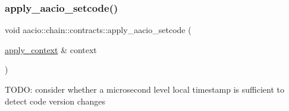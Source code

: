 \subsubsection{\texorpdfstring{apply\+\_\+aacio\+\_\+setcode()}{apply\_aacio\_setcode()}}
{\footnotesize\ttfamily void aacio\+::chain\+::contracts\+::apply\+\_\+aacio\+\_\+setcode (\begin{DoxyParamCaption}\item[{\mbox{\hyperlink{classaacio_1_1chain_1_1apply__context}{apply\+\_\+context}} \&}]{context }\end{DoxyParamCaption})}

T\+O\+DO\+: consider whether a microsecond level local timestamp is sufficient to detect code version changes 